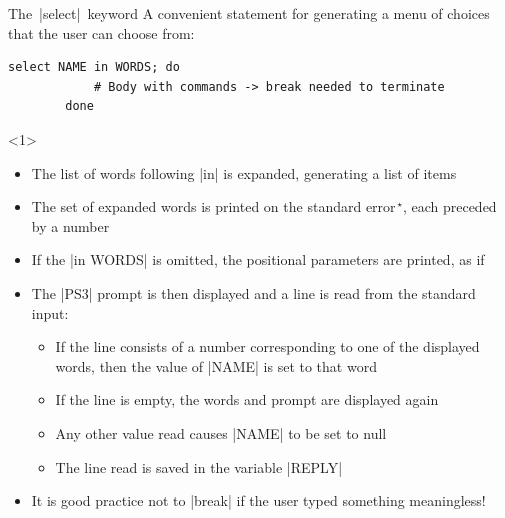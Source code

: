 \begin{frame}[fragile]{The \,\bash|select|\, keyword}
    \vspace{-2mm}
    A convenient statement for generating a menu of choices that the user can choose from:
    \medskip
    \begin{lstlisting}[style=MyBash, numbers=none, belowskip=-5mm]
        select NAME in WORDS; do
            # Body with commands -> break needed to terminate
        done
    \end{lstlisting}
    \vspace{1.5mm}
    \begin{overlayarea}{\textwidth}{\textheight}
        \begin{onlyenv}<1>
            \vspace{1.5mm}
            \begin{itemize}
                \item The list of words following \;\bash|in|\; is expanded, generating a list of items
                \item The set of expanded words is printed on the \alert{standard error}$^{\,\star}$, each preceded by a number
                \item If the \;\bash|in WORDS|\; is omitted, the positional parameters are printed, as if \;
                \item The \;\bash|PS3|\; prompt is then displayed and a line is read from the standard input:
                      \begin{itemize}
                          \item[$\circ$] If the line consists of a number corresponding to one of the displayed words, then the value of \;\bash|NAME|\; is set to that word
                          \item[$\circ$] If the line is empty, the words and prompt are displayed again
                          \item[$\circ$] Any other value read causes \;\bash|NAME|\; to be set to null
                          \item[$\circ$] The line read is saved in the variable \;\bash|REPLY|
                      \end{itemize}
                \item It is good practice not to \;\bash|break|\; if the user typed something meaningless!
            \end{itemize}
        \end{onlyenv}

\end{overlayarea}
\end{frame}
